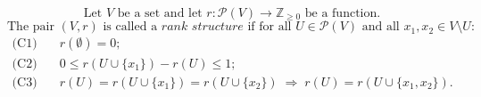 $$
\text{Let }V\text{ be a set and let }r\colon \mathcal{P}(V)\to \mathbb{Z}_{\geq 0}\text{ be a function.}
$$
$$
\text{The pair }(V, r)\text{ is called a }\textit{rank structure}\text{ if for all }U \in \mathcal{P}(V)\text{ and all }x_1, x_2 \in V \setminus U:
$$
\begin{align}
\text{(C1)}\quad & r(\emptyset) = 0; \\
\text{(C2)}\quad & 0 \leq r(U \cup \{x_1\}) - r(U) \leq 1; \\
\text{(C3)}\quad & r(U) = r(U \cup \{x_1\}) = r(U \cup \{x_2\}) \;\Longrightarrow\; r(U) = r(U \cup \{x_1, x_2\}).
\end{align}
$$
